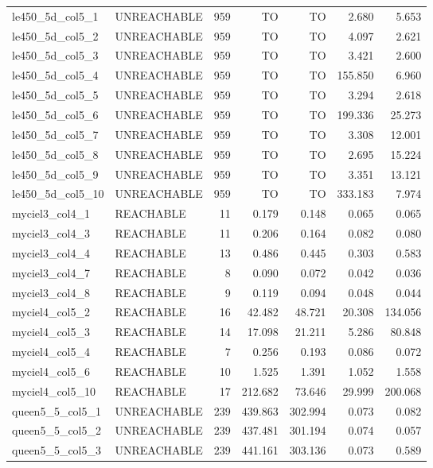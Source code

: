 \begin{tabular}{llr|rrrr}
  le450\_5d\_col5\_1 & UNREACHABLE & 959 & TO & TO & 2.680 & 5.653 \\
  le450\_5d\_col5\_2 & UNREACHABLE & 959 & TO & TO & 4.097 & 2.621 \\
  le450\_5d\_col5\_3 & UNREACHABLE & 959 & TO & TO & 3.421 & 2.600 \\
  le450\_5d\_col5\_4 & UNREACHABLE & 959 & TO & TO & 155.850 & 6.960 \\
  le450\_5d\_col5\_5 & UNREACHABLE & 959 & TO & TO & 3.294 & 2.618 \\
  le450\_5d\_col5\_6 & UNREACHABLE & 959 & TO & TO & 199.336 & 25.273 \\
  le450\_5d\_col5\_7 & UNREACHABLE & 959 & TO & TO & 3.308 & 12.001 \\
  le450\_5d\_col5\_8 & UNREACHABLE & 959 & TO & TO & 2.695 & 15.224 \\
  le450\_5d\_col5\_9 & UNREACHABLE & 959 & TO & TO & 3.351 & 13.121 \\ \hline
  le450\_5d\_col5\_10 & UNREACHABLE & 959 & TO & TO & 333.183 & 7.974 \\
  myciel3\_col4\_1 & REACHABLE & 11 & 0.179 & 0.148 & 0.065 & 0.065 \\
  myciel3\_col4\_3 & REACHABLE & 11 & 0.206 & 0.164 & 0.082 & 0.080 \\
  myciel3\_col4\_4 & REACHABLE & 13 & 0.486 & 0.445 & 0.303 & 0.583 \\
  myciel3\_col4\_7 & REACHABLE & 8 & 0.090 & 0.072 & 0.042 & 0.036 \\
  myciel3\_col4\_8 & REACHABLE & 9 & 0.119 & 0.094 & 0.048 & 0.044 \\
  myciel4\_col5\_2 & REACHABLE & 16 & 42.482 & 48.721 & 20.308 & 134.056 \\
  myciel4\_col5\_3 & REACHABLE & 14 & 17.098 & 21.211 & 5.286 & 80.848 \\
  myciel4\_col5\_4 & REACHABLE & 7 & 0.256 & 0.193 & 0.086 & 0.072 \\
  myciel4\_col5\_6 & REACHABLE & 10 & 1.525 & 1.391 & 1.052 & 1.558 \\ \hline
  myciel4\_col5\_10 & REACHABLE & 17 & 212.682 & 73.646 & 29.999 & 200.068 \\
  queen5\_5\_col5\_1 & UNREACHABLE & 239 & 439.863 & 302.994 & 0.073 & 0.082 \\
  queen5\_5\_col5\_2 & UNREACHABLE & 239 & 437.481 & 301.194 & 0.074 & 0.057 \\
  queen5\_5\_col5\_3 & UNREACHABLE & 239 & 441.161 & 303.136 & 0.073 & 0.589 \\

\end{tabular}
